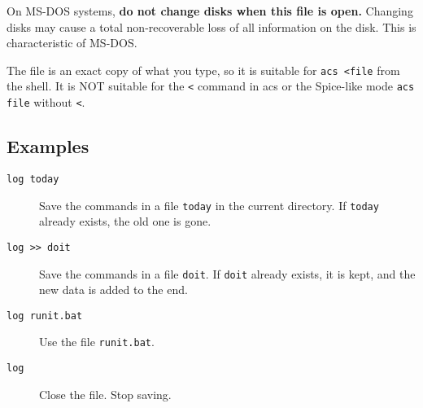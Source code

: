 On MS-DOS systems, {\bf do not change disks when this file is open.}
Changing disks may cause a total non-recoverable loss of all information on
the disk.  This is characteristic of MS-DOS.

The file is an exact copy of what you type, so it is suitable for
{\tt acs <file} from the shell.  It is NOT suitable for the {\tt <}
command in acs or the Spice-like mode {\tt acs file} without {\tt <}.
\subsection{Examples}

\begin{description}

\item[{\tt log today}] Save the commands in a file {\tt today} in the
current directory.  If {\tt today} already exists, the old one is gone.

\item[{\tt log >> doit}] Save the commands in a file {\tt doit}.  If
{\tt doit} already exists, it is kept, and the new data is added to the
end.

\item[{\tt log runit.bat}] Use the file {\tt runit.bat}.

\item[{\tt log}] Close the file.  Stop saving.

\end{description}
